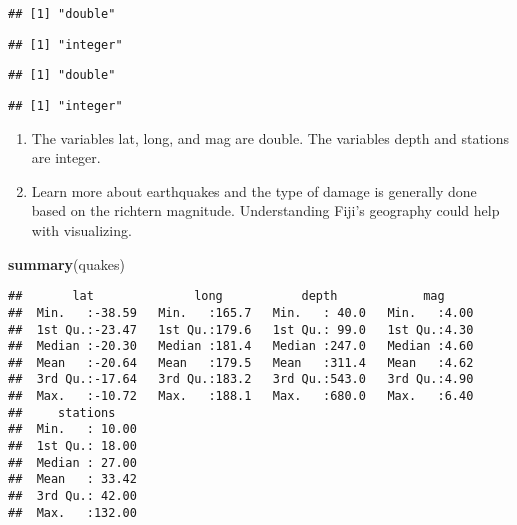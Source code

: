 \documentclass[]{article}
\newenvironment{Shaded}{\begin{snugshade}}{\end{snugshade}}
\newcommand{\KeywordTok}[1]{\textcolor[rgb]{0.13,0.29,0.53}{\textbf{#1}}}
\newcommand{\NormalTok}[1]{#1}
\newcommand{\OperatorTok}[1]{\textcolor[rgb]{0.81,0.36,0.00}{\textbf{#1}}}
\begin{document}
\begin{verbatim}
## [1] "double"
\end{verbatim}

\begin{Shaded}
\end{Shaded}

\begin{verbatim}
## [1] "integer"
\end{verbatim}

\begin{Shaded}
\end{Shaded}

\begin{verbatim}
## [1] "double"
\end{verbatim}

\begin{Shaded}
\end{Shaded}

\begin{verbatim}
## [1] "integer"
\end{verbatim}

\begin{enumerate}
\def\labelenumi{\arabic{enumi}.}
\setcounter{enumi}{2}
\item
  The variables lat, long, and mag are double. The variables depth and
  stations are integer.
\item
  Learn more about earthquakes and the type of damage is generally done
  based on the richtern magnitude. Understanding Fiji's geography could
  help with visualizing.
\end{enumerate}

\begin{Shaded}
\begin{Highlighting}[]
\KeywordTok{summary}\NormalTok{(quakes)}
\end{Highlighting}
\end{Shaded}

\begin{verbatim}
##       lat              long           depth            mag      
##  Min.   :-38.59   Min.   :165.7   Min.   : 40.0   Min.   :4.00  
##  1st Qu.:-23.47   1st Qu.:179.6   1st Qu.: 99.0   1st Qu.:4.30  
##  Median :-20.30   Median :181.4   Median :247.0   Median :4.60  
##  Mean   :-20.64   Mean   :179.5   Mean   :311.4   Mean   :4.62  
##  3rd Qu.:-17.64   3rd Qu.:183.2   3rd Qu.:543.0   3rd Qu.:4.90  
##  Max.   :-10.72   Max.   :188.1   Max.   :680.0   Max.   :6.40  
##     stations     
##  Min.   : 10.00  
##  1st Qu.: 18.00  
##  Median : 27.00  
##  Mean   : 33.42  
##  3rd Qu.: 42.00  
##  Max.   :132.00
\end{verbatim}
\end{document}
